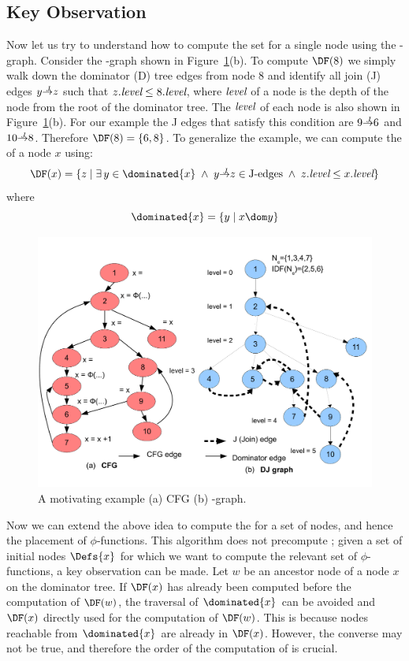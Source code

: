 {\subsection{Key Observation} 
 
Now let us try to understand how to compute the \DF set for a single node using the \DJ-graph. 
Consider  the \DJ-graph shown in Figure~\ref{fig:cfg}(b). To compute $\DF(8)$ we simply walk down the
dominator (D) tree edges from node 8 and identify all join (J) edges $y \st{J} z$ such
that $z.\textit{level} \leq 8.\textit{level}$, where $\textit{level}$ of a node is the depth of the node from the
root of the dominator tree. The $\textit{level}$ of each node is also shown in Figure~\ref{fig:cfg}(b).
For our example the J edges that satisfy this 
condition are $9 \st{J} 6$ and $10 \st{J} 8$. Therefore $\DF(8) = \{6, 8\}$. To generalize the example, we can
compute the \DF of a node $x$ using:
$$\DF(x) = \{z\mid\exists\, y\in\dominated{x} \; \wedge \; y \st{J} z \in \textrm{J-edges} \; \wedge \; z.\level \leq x.\level \}$$
where 
$$\dominated{x} = \{ y\mid x\dom y \}$$


    \begin{figure}[htb]
    \centerline{\includegraphics[scale=0.4]{cfglive_new.pdf}}
    \caption{A motivating example (a) CFG (b) \DJ-graph.}
    \label{fig:cfg}
    \end{figure} 

Now we can extend the above idea to compute the \iDF for a set of nodes, and 
hence the placement of $\phi$-functions. This algorithm does not precompute \DF; given a set of initial nodes $\Defs{x}$ for which we want to compute the relevant set of $\phi$-functions,
a key observation can be made. Let $w$ be an ancestor node of a node $x$ on the dominator tree. If $\DF(x)$ has already been computed before the computation of $\DF(w)$,  the traversal of $\dominated{x}$ can be avoided and $\DF(x)$ directly used for the computation of $\DF(w)$. This is because nodes reachable from $\dominated{x}$ are already in $\DF(x)$. However, the converse may not be true, and  therefore the order of the computation of \DF is crucial.

}
